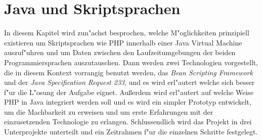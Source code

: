 \chapter{Java und Skriptsprachen}
\label{sec:javanscripts}
In diesem Kapitel wird zun"achst besprochen, welche M"oglichkeiten prinzipiell existieren
um Skriptsprachen wie PHP innerhalb einer Java Virtual Machine auszuf"uhren und um Daten 
zwischen den Laufzeitumgebungen der beiden Programmiersprachen auszutauschen. Dann werden zwei Technologien vorgestellt,
die in diesem Kontext vorrangig benutzt werden, das \emph{Bean Scripting Framework} und der
\emph{Java Specification Request 233},  und es wird erl"autert welche sich besser f"ur die L"osung 
der Aufgabe eignet. Au\ss erdem wird erl"autert auf welche Weise PHP in Java integriert
werden soll und es wird ein simpler Prototyp entwickelt, um die Machbarkeit zu erweisen und um erste Erfahrungen
mit der einzusetzenden Technologie zu erlangen. Schlussendlich wird das Projekt in drei Unterprojekte
unterteilt und ein Zeitrahmen f"ur die einzelnen Schritte festgelegt.

